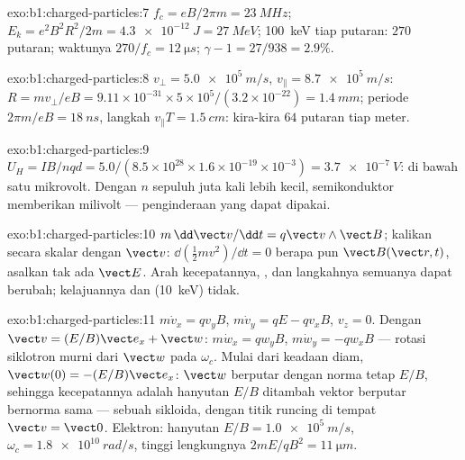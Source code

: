\begin{solution}{exo:b1:charged-particles:7}
$f_c = eB/2\pi m = \qty{23}{MHz}$; $E_k = e^2B^2R^2/2m = \qty{4.3e-12}{J} =
\qty{27}{MeV}$; \qty{100}{keV} tiap putaran: $270$ putaran; waktunya $270/f_c =
\qty{12}{\micro s}$; $\gamma - 1 = 27/938 = 2.9\%$.
\end{solution}

\begin{solution}{exo:b1:charged-particles:8}
$v_\perp = \qty{5.0e5}{m/s}$, $v_\parallel = \qty{8.7e5}{m/s}$: $R = mv_\perp/eB
= 9.11\times10^{-31} \times 5\times10^5/(3.2\times10^{-22}) = \qty{1.4}{mm}$;
periode $2\pi m/eB = \qty{18}{ns}$, langkah $v_\parallel T = \qty{1.5}{cm}$:
kira-kira $64$ putaran tiap meter.
\end{solution}

\begin{solution}{exo:b1:charged-particles:9}
$U_H = IB/nqd = 5.0/(8.5\times10^{28} \times 1.6\times10^{-19} \times 10^{-3})
= \qty{3.7e-7}{V}$: di bawah satu mikrovolt. Dengan $n$ sepuluh juta kali lebih
kecil, semikonduktor memberikan milivolt --- penginderaan yang dapat dipakai.
\end{solution}

\begin{solution}{exo:b1:charged-particles:10}
$m\,\dd\vect v/\dd t = q\vect v\wedge\vect B$; kalikan secara skalar dengan $\vect v$: $\dd(\tfrac12 mv^2)/
\dd t = 0$ berapa pun $\vect B(\vect r, t)$, asalkan tak ada $\vect E$. Arah
kecepatannya, , dan langkahnya semuanya dapat
berubah; kelajuannya dan  (\qty{10}{keV}) tidak.
\end{solution}

\begin{solution}{exo:b1:charged-particles:11}
$m\dot v_x = qv_yB$, $m\dot v_y = qE - qv_xB$, $v_z = 0$. Dengan $\vect v =
(E/B)\vect e_x + \vect w$: $m\dot w_x = qw_yB$, $m\dot w_y = -qw_xB$ --- rotasi
siklotron murni dari $\vect w$ pada $\omega_c$. Mulai dari keadaan diam,
$\vect w(0) = -(E/B)\vect e_x$: $\vect w$ berputar dengan norma tetap $E/B$, sehingga
kecepatannya adalah hanyutan $E/B$ ditambah vektor berputar bernorma sama ---
sebuah sikloida, dengan titik runcing di tempat $\vect v = \vect 0$. Elektron: hanyutan $E/B =
\qty{1.0e5}{m/s}$, $\omega_c = \qty{1.8e10}{rad/s}$, tinggi lengkungnya $2mE/qB^2 =
\qty{11}{\micro m}$.
\end{solution}

